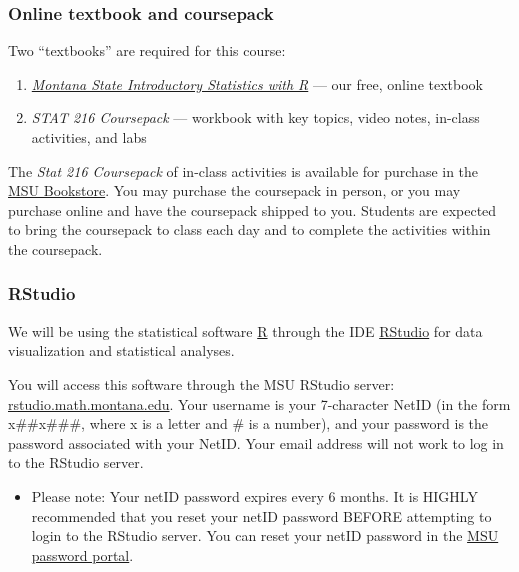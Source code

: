 \documentclass[
]{article}
\providecommand{\tightlist}{%
  \setlength{\itemsep}{0pt}\setlength{\parskip}{0pt}}
\begin{document}
\subsubsection{Online textbook and
coursepack}\label{online-textbook-and-coursepack}

Two ``textbooks'' are required for this course:

\begin{enumerate}
\def\labelenumi{\arabic{enumi}.}
\tightlist
\item
  \href{https://mtstateintrostats.github.io/IntroStatTextbook/}{\emph{Montana
  State Introductory Statistics with R}} --- our free, online textbook
\item
  \emph{STAT 216 Coursepack} --- workbook with key topics, video notes,
  in-class activities, and labs
\end{enumerate}

The \emph{Stat 216 Coursepack} of in-class activities is available for
purchase in the \href{https://www.msubookstore.org/}{MSU Bookstore}. You
may purchase the coursepack in person, or you may purchase online and
have the coursepack shipped to you. Students are expected to bring the
coursepack to class each day and to complete the activities within the
coursepack.

\subsubsection{RStudio}\label{rstudio}

We will be using the statistical software
\href{https://www.r-project.org/}{R} through the IDE
\href{https://rstudio.com/products/rstudio/}{RStudio} for data
visualization and statistical analyses.

You will access this software through the MSU RStudio server:
\href{https://rstudio.math.montana.edu/}{rstudio.math.montana.edu}. Your
username is your 7-character NetID (in the form x\#\#x\#\#\#, where x is
a letter and \# is a number), and your password is the password
associated with your NetID. Your email address will not work to log in
to the RStudio server.

\begin{itemize}
\tightlist
\item
  Please note: Your netID password expires every 6 months. It is HIGHLY
  recommended that you reset your netID password BEFORE attempting to
  login to the RStudio server. You can reset your netID password in the
  \href{https://pwreset.montana.edu/react/}{MSU password portal}.
\end{itemize}
\end{document}
